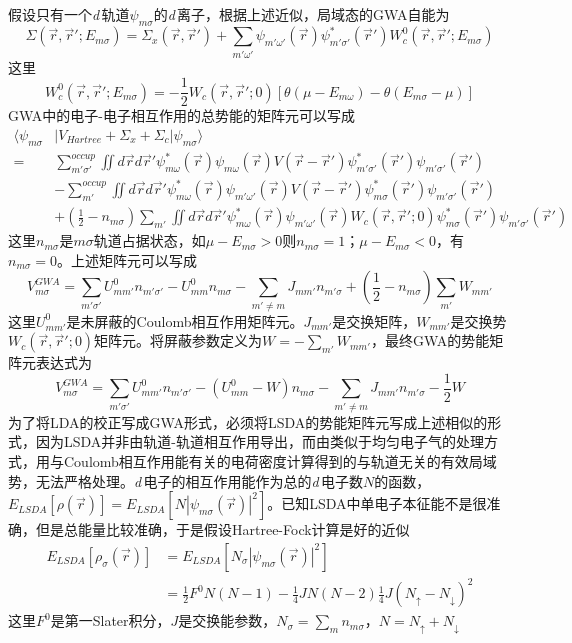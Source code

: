 假设只有一个{\it d}\,轨道$\psi_{m\sigma}$的{\it d}\,离子，根据上述近似，局域态的GWA自能为
\begin{equation}
  \Sigma(\vec r,\vec r';E_{m\sigma})=\Sigma_x(\vec r,\vec r')+\sum_{m'\omega'}\psi_{m'\omega'}(\vec r)\psi_{m'\sigma'}^{\ast}(\vec r')W_c^0(\vec r,\vec r';E_{m\sigma})
  \label{eq:solid-245}
\end{equation}
这里$$W_c^0(\vec r,\vec r';E_{m\sigma})=-\frac12W_c(\vec r,\vec r';0)[\theta(\mu-E_{m\omega})-\theta(E_{m\sigma}-\mu)]$$
GWA中的电子-电子相互作用的总势能的矩阵元可以写成
\begin{equation}
  \begin{split}
    \langle\psi_{m\sigma}&|V_{Hartree}+\Sigma_x+\Sigma_c|\psi_{m\sigma}\rangle\\
    =&\sum_{m'\sigma'}^{occup}\iint d\vec rd\vec r'\psi_{m\omega}^{\ast}(\vec r)\psi_{m\omega}(\vec r)V(\vec r-\vec r')\psi_{m'\sigma'}^{\ast}(\vec r')\psi_{m'\sigma'}(\vec r')\\
    &-\sum_{m'}^{occup}\iint d\vec rd\vec r'\psi_{m\omega}^{\ast}(\vec r)\psi_{m'\omega'}(\vec r)V(\vec r-\vec r')\psi_{m\sigma}^{\ast}(\vec r')\psi_{m'\sigma'}(\vec r')\\
    &+\left(\frac12-n_{m\sigma}\right)\sum_{m'}\iint d\vec rd\vec r'\psi_{m\omega}^{\ast}(\vec r)\psi_{m'\omega'}(\vec r)W_c(\vec r,\vec r';0)\psi_{m\sigma}^{\ast}(\vec r')\psi_{m'\sigma'}(\vec r')
  \end{split}
  \label{eq:solid-246}
\end{equation}
这里$n_{m\sigma}$是$m\sigma$轨道占据状态，如$\mu-E_{m\sigma}>0$则$n_{m\sigma}=1$；$\mu-E_{m\sigma}<0$，有$n_{m\sigma}=0$。上述矩阵元可以写成
$$V_{m\sigma}^{GWA}=\sum_{m'\sigma'}U_{mm'}^0n_{m'\sigma'}-U_{mm}^0n_{m\sigma}-\sum_{m'\neq m}J_{mm'}n_{m'\sigma}+\left(\frac12-n_{m\sigma}\right)\sum_{m'}W_{mm'}$$
这里$U_{mm'}^0$是未屏蔽的Coulomb相互作用矩阵元。$J_{mm'}$是交换矩阵，$W_{mm'}$是交换势$W_c(\vec r,\vec r';0)$矩阵元。将屏蔽参数定义为$W=-\sum\limits_{m'}W_{mm'}$，最终GWA的势能矩阵元表达式为\cite{JPCM9-767_1997}
\begin{equation}
  V_{m\sigma}^{GWA}=\sum_{m'\sigma'}U_{mm'}^0n_{m'\sigma'}-(U_{mm}^0-W)n_{m\sigma}-\sum_{m'\neq m}J_{mm'}n_{m'\sigma}-\frac12W
  \label{eq:solid-247}
\end{equation}
为了将LDA的校正写成GWA形式，必须将LSDA的势能矩阵元写成上述相似的形式，因为LSDA并非由轨道-轨道相互作用导出，而由类似于均匀电子气的处理方式，用与Coulomb相互作用能有关的电荷密度计算得到的与轨道无关的有效局域势，无法严格处理。{\it d}\,电子的相互作用能作为总的{\it d}\,电子数$N$的函数，$E_{LSDA}[\rho(\vec r)]=E_{LSDA}[N|\psi_{m\sigma}(\vec r)|^2]$。已知LSDA中单电子本征能不是很准确，但是总能量比较准确，于是假设Hartree-Fock计算是好的近似
\begin{equation}
  \begin{split}
   E_{LSDA}[\rho_{\sigma}(\vec r)]&=E_{LSDA}[N_{\sigma}|\psi_{m\sigma}(\vec r)|^2]\\
   &=\frac12F^0N(N-1)-\frac14JN(N-2)\frac14J(N_{\uparrow}-N_{\downarrow})^2
 \end{split}
  \label{eq:solid-248}
\end{equation}
这里$F^0$是第一Slater积分，$J$是交换能参数，$N_{\sigma}=\sum\nolimits_mn_{m\sigma}$，$N=N_{\uparrow}+N_{\downarrow}$

